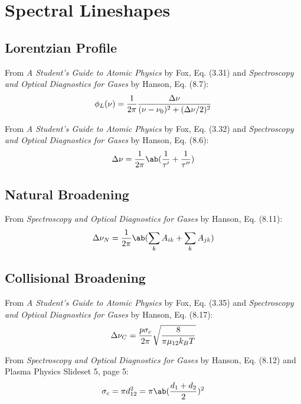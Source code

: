 \documentclass[11pt, twoside, fleqn]{report}
\begin{document}
\section{Spectral Lineshapes}

\subsection{Lorentzian Profile}

From \textit{A Student's Guide to Atomic Physics} by Fox, Eq. (3.31) and \textit{Spectroscopy and Optical Diagnostics for Gases} by Hanson, Eq. (8.7):
\begin{equation*}
    \phi_{L}(\nu) = \frac{1}{2\pi}\frac{\adif{\nu}}{(\nu - \nu_{0})^{2} + (\adif{\nu}/2)^{2}}
\end{equation*}

From \textit{A Student's Guide to Atomic Physics} by Fox, Eq. (3.32) and \textit{Spectroscopy and Optical Diagnostics for Gases} by Hanson, Eq. (8.6):
\begin{equation*}
    \adif{\nu} = \frac{1}{2\pi}\ab(\frac{1}{\tau'} + \frac{1}{\tau''})
\end{equation*}

\subsection{Natural Broadening}

From \textit{Spectroscopy and Optical Diagnostics for Gases} by Hanson, Eq. (8.11):
\begin{equation*}
    \adif{\nu}_{N} = \frac{1}{2\pi}\ab(\sum_{k} A_{ik} + \sum_{k} A_{jk})
\end{equation*}

\subsection{Collisional Broadening}

From \textit{A Student's Guide to Atomic Physics} by Fox, Eq. (3.35) and \textit{Spectroscopy and Optical Diagnostics for Gases} by Hanson, Eq. (8.17):
\begin{equation*}
    \adif{\nu}_{C} = \frac{p\sigma_{c}}{2\pi}\sqrt{\frac{8}{\pi\mu_{12}k_{B}T}}
\end{equation*}

From \textit{Spectroscopy and Optical Diagnostics for Gases} by Hanson, Eq. (8.12) and Plasma Physics Slideset 5, page 5:
\begin{equation*}
    \sigma_{c} = \pi d_{12}^{2} = \pi\ab(\frac{d_{1} + d_{2}}{2})^{2}
\end{equation*}
\end{document}
